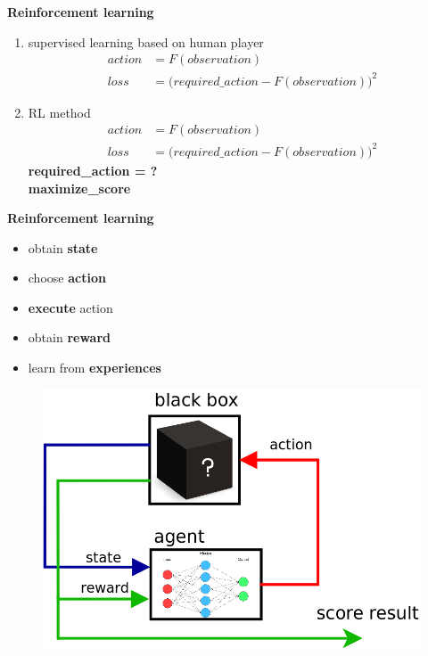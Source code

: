 \documentclass[xcolor=dvipsnames]{beamer}
\begin{document}
\begin{frame}{\bf Reinforcement learning}


\begin{enumerate}
 \item supervised learning based on human player \\
             \begin{align*}
               action &= F(observation) \\
               loss   &= \Big(required\_action - F(observation)\Big)^2
             \end{align*}
 \item RL method \\
             \begin{align*}
               action &= F(observation) \\
               loss   &= \Big(required\_action - F(observation)\Big)^2
             \end{align*}
             {\bf \color{red} required\_action = ?} \\
             {\bf \color{green} maximize\_score}

\end{enumerate}

\end{frame}


\begin{frame}{\bf Reinforcement learning}

\begin{itemize}
  \item obtain {\bf state}
  \item choose {\bf action}
  \item {\bf execute} action
  \item obtain {\bf reward}
  \item learn from {\bf experiences}
\end{itemize}

  \begin{figure}
    \includegraphics[scale=0.3]{../../diagrams/rl_mechanism.png}
  \end{figure}

\end{frame}
\end{document}
